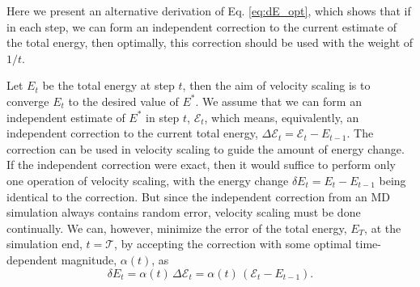 \documentclass[reprint]{revtex4-1}
\begin{document}
\newcommand{\tmax}{\mathcal T}

Here we present an alternative derivation of Eq. \eqref{eq:dE_opt},
which shows that if in each step, we can form an independent correction
to the current estimate of the total energy,
then optimally,
this correction should be used
with the weight of $1/t$.

Let $E_t$ be the total energy at step $t$,
then the aim of velocity scaling is to converge $E_t$
to the desired value of $E^*$.
%
We assume that we can form an independent estimate of $E^*$
in step $t$, $\mathcal E_t$,
which means, equivalently, an independent correction
to the current total energy,
$\Delta \mathcal E_t = \mathcal E_t - E_{t-1}$.
%
The correction can be used in velocity scaling
to guide the amount of energy change.
%
If the independent correction were exact,
then it would suffice to perform
only one operation of velocity scaling,
with the energy change
$\delta E_t = E_t - E_{t-1}$
being identical to the correction.
%
But since
the independent correction from an MD simulation
always contains random error,
velocity scaling must be done continually.
%
We can, however, minimize the error
of the total energy, $E_T$,
at the simulation end, $t = \tmax$,
by accepting the correction with some
optimal time-dependent magnitude, $\alpha(t)$,
as
%
\begin{equation}
  \delta E_t
  =
  \alpha(t) \, \Delta \mathcal E_t
  =
  \alpha(t) \, \left( \mathcal E_t - E_{t - 1} \right)
  .
  \label{eq:Eupdate}
\end{equation}
%
\end{document}
